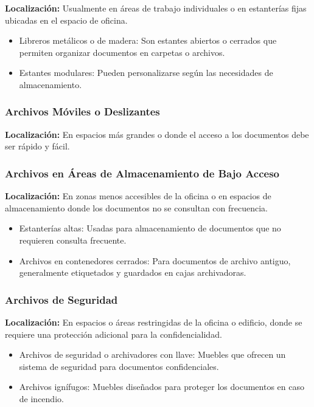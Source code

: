 \documentclass{article}
\begin{document}
\textbf{Localización:} Usualmente en áreas de trabajo individuales o en estanterías fijas ubicadas en el espacio de oficina.

\begin{itemize}
    \item   Libreros metálicos o de madera: Son estantes abiertos o cerrados que permiten organizar documentos en carpetas o archivos.
    \item   Estantes modulares: Pueden personalizarse según las necesidades de almacenamiento.
\end{itemize}

\subsubsection{Archivos Móviles o Deslizantes}

\textbf{Localización:} En espacios más grandes o donde el acceso a los documentos debe ser rápido y fácil.

\subsubsection{Archivos en Áreas de Almacenamiento de Bajo Acceso}

\textbf{Localización:} En zonas menos accesibles de la oficina o en espacios de almacenamiento donde los documentos no se consultan con frecuencia.

\begin{itemize}
    \item   Estanterías altas: Usadas para almacenamiento de documentos que no requieren consulta frecuente.
    \item   Archivos en contenedores cerrados: Para documentos de archivo antiguo, generalmente etiquetados y guardados en cajas archivadoras.
\end{itemize}

\subsubsection{Archivos de Seguridad}

\textbf{Localización:} En espacios o áreas restringidas de la oficina o edificio, donde se requiere una protección adicional para la confidencialidad.

\begin{itemize}
    \item   Archivos de seguridad o archivadores con llave: Muebles que ofrecen un sistema de seguridad para documentos confidenciales.
    \item   Archivos ignífugos: Muebles diseñados para proteger los documentos en caso de incendio.
\end{itemize}
\end{document}
